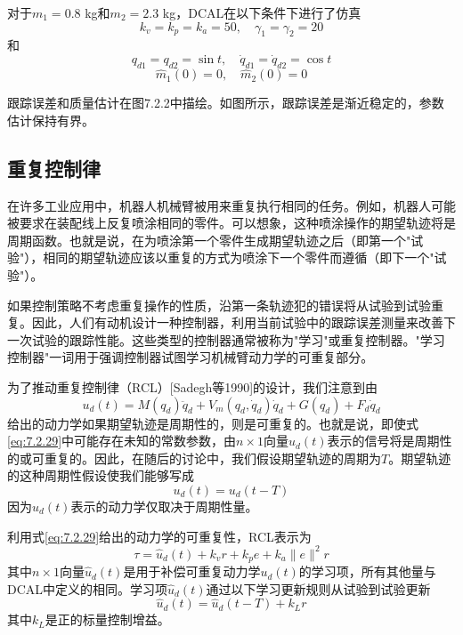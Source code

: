 \documentclass[UTF8]{ctexart}
\begin{document}
对于$m_1=0.8$ kg和$m_2=2.3$ kg，DCAL在以下条件下进行了仿真
\begin{equation*}
k_v = k_p = k_a = 50, \quad \gamma_1 = \gamma_2 = 20
\end{equation*}
和
\begin{equation*}
q_{d1} = q_{d2} = \sin t, \quad \dot{q}_{d1} = \dot{q}_{d2} = \cos t
\end{equation*}
\begin{equation*}
\hat{m}_1(0) = 0, \quad \hat{m}_2(0) = 0
\end{equation*}

跟踪误差和质量估计在图7.2.2中描绘。如图所示，跟踪误差是渐近稳定的，参数估计保持有界。

\subsection{重复控制律}

在许多工业应用中，机器人机械臂被用来重复执行相同的任务。例如，机器人可能被要求在装配线上反复喷涂相同的零件。可以想象，这种喷涂操作的期望轨迹将是周期函数。也就是说，在为喷涂第一个零件生成期望轨迹之后（即第一个"试验"），相同的期望轨迹应该以重复的方式为喷涂下一个零件而遵循（即下一个"试验"）。

如果控制策略不考虑重复操作的性质，沿第一条轨迹犯的错误将从试验到试验重复。因此，人们有动机设计一种控制器，利用当前试验中的跟踪误差测量来改善下一次试验的跟踪性能。这些类型的控制器通常被称为"学习"或重复控制器。"学习控制器"一词用于强调控制器试图学习机械臂动力学的可重复部分。

为了推动重复控制律（RCL）[Sadegh等1990]的设计，我们注意到由
\begin{equation}\label{eq:7.2.29}
u_d(t) = M(q_d)\ddot{q}_d + V_m(q_d,\dot{q}_d)\dot{q}_d + G(q_d) + F_d\dot{q}_d
\end{equation}
给出的动力学如果期望轨迹是周期性的，则是可重复的。也就是说，即使式\eqref{eq:7.2.29}中可能存在未知的常数参数，由$n \times 1$向量$u_d(t)$表示的信号将是周期性的或可重复的。因此，在随后的讨论中，我们假设期望轨迹的周期为$T$。期望轨迹的这种周期性假设使我们能够写成
\begin{equation}\label{eq:7.2.30}
u_d(t) = u_d(t-T)
\end{equation}
因为$u_d(t)$表示的动力学仅取决于周期性量。

利用式\eqref{eq:7.2.29}给出的动力学的可重复性，RCL表示为
\begin{equation}\label{eq:7.2.31}
\tau = \hat{u}_d(t) + k_v r + k_p e + k_a\|e\|^2r
\end{equation}
其中$n \times 1$向量$\hat{u}_d(t)$是用于补偿可重复动力学$u_d(t)$的学习项，所有其他量与DCAL中定义的相同。学习项$\hat{u}_d(t)$通过以下学习更新规则从试验到试验更新
\begin{equation}\label{eq:7.2.32}
\hat{u}_d(t) = \hat{u}_d(t-T) + k_L r
\end{equation}
其中$k_L$是正的标量控制增益。
\end{document}
